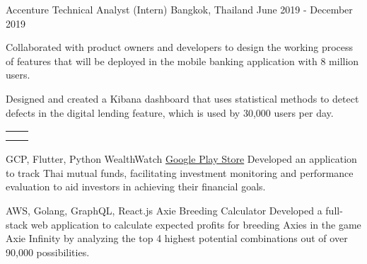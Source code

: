 \documentclass[]{awesome-cv}
\begin{document}
\begin{cventries}
{\begin{cvitems}
		\end{cvitems}}
	\cventry
	{Accenture}
	{Technical Analyst (Intern)}
	{Bangkok, Thailand}
	{June 2019 - December 2019}
	{\begin{cvitems}
			\item {Collaborated with product owners and developers to design the working process\\ of features that will be deployed in the mobile banking application with 8 million users.}
			\item {Designed and created a Kibana dashboard that uses statistical methods to detect\\ defects in the digital lending feature, which is used by 30,000 users per day.}
		\end{cvitems}}
\end{cventries}

\vspace{-5mm}
\begin{cvskills}
	\cvskill
	{{\begin{tabular}{ L{2.5cm} l }
		 & {} \\
		   & {}                          \\
	\end{tabular}}}
\end{cvskills}

\vspace{-9mm}
\begin{cventries}
	\cventry
	{GCP, Flutter, Python}
	{WealthWatch}
	{\href{https://play.google.com/store/apps/details?id=com.wealthwatch.portfolioapp}{Google Play Store}}
	{}
	{Developed an application to track Thai mutual funds, facilitating investment monitoring and performance evaluation to aid investors in achieving their financial goals.}
\end{cventries}
\begin{cventries}
	\cventry
	{AWS, Golang, GraphQL, React.js}
	{Axie Breeding Calculator}
	{}
	{}
	{Developed a full-stack web application to calculate expected profits for breeding Axies in the game Axie Infinity by analyzing the top 4 highest potential combinations out of over 90,000 possibilities.}
\end{cventries}
\end{document}
